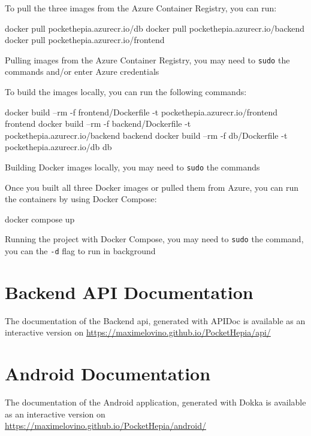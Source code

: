 \documentclass[twoside, openright,11pt,a4paper]{book}
\newenvironment{code}{\captionsetup{type=listing}}{}
\begin{document}
\begin{appendices}
To pull the three images from the Azure Container Registry, you can run:
\begin{code}
\begin{shell}
docker pull pockethepia.azurecr.io/db
docker pull pockethepia.azurecr.io/backend
docker pull pockethepia.azurecr.io/frontend
\end{shell}
	\caption[Pulling images from the Azure Container Registry]{Pulling images from the Azure Container Registry, you may need to \texttt{sudo} the commands and/or enter Azure credentials}
\end{code}
To build the images locally, you can run the following commands:
\begin{code}
\begin{shell}
docker build --rm -f frontend/Dockerfile -t pockethepia.azurecr.io/frontend frontend
docker build --rm -f backend/Dockerfile -t pockethepia.azurecr.io/backend backend
docker build --rm -f db/Dockerfile -t pockethepia.azurecr.io/db db
\end{shell}
	\caption[Building Docker images locally]{Building Docker images locally, you may need to \texttt{sudo} the commands}
\end{code}

Once you built all three Docker images or pulled them from Azure, you can run the containers by using Docker Compose:
\begin{code}
\begin{shell}
docker compose up
\end{shell}
	\caption[Running the project with Docker Compose]{Running the project with Docker Compose, you may need to \texttt{sudo} the command, you can the \texttt{-d} flag to run in background}
\end{code}

\chapter{Backend API Documentation}
\label{appendix_api_doc}
The documentation of the Backend \gls{api}, generated with APIDoc is available as an interactive version on \url{https://maximelovino.github.io/PocketHepia/api/}
\chapter{Android Documentation}
The documentation of the Android application, generated with Dokka is available as an interactive version on \url{https://maximelovino.github.io/PocketHepia/android/}
\end{appendices}
\end{document}
